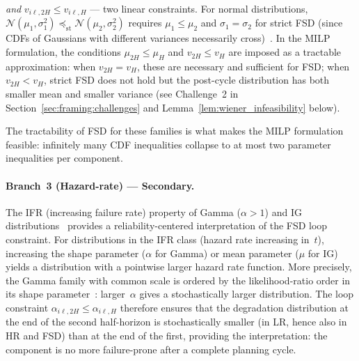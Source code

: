 \documentclass[11pt,a4paper]{article}
\theoremstyle{plain}
\theoremstyle{definition}
\theoremstyle{remark}
\begin{document}
\begin{itemize}[nosep]
        \emph{and} $v_{i\ell,2H} \le v_{i\ell,H}$ --- two linear constraints.
        For normal distributions, $\mathcal{N}(\mu_1, \sigma_1^2)
        \preceq_{\mathrm{st}} \mathcal{N}(\mu_2, \sigma_2^2)$ requires
        $\mu_1 \le \mu_2$ and $\sigma_1 = \sigma_2$ for strict FSD
        (since CDFs of Gaussians with different variances necessarily
        cross)~\cite[Ex.~1.A.7]{shaked2007}. In the MILP formulation,
        the conditions $\mu_{2H} \le \mu_H$ and $v_{2H} \le v_H$ are
        imposed as a tractable approximation: when $v_{2H} = v_H$,
        these are necessary and sufficient for FSD; when $v_{2H} < v_H$,
        strict FSD does not hold but the post-cycle distribution has both
        smaller mean and smaller variance
        (see Challenge~2 in Section~\ref{sec:framing:challenges}
        and Lemma~\ref{lem:wiener_infeasibility} below).
\end{itemize}
The tractability of FSD for these families is what makes
the MILP formulation feasible: infinitely many CDF inequalities collapse
to at most two parameter inequalities per component.

\paragraph{Branch~3 (Hazard-rate) --- Secondary.}
The IFR (increasing failure rate) property of Gamma ($\alpha > 1$) and IG
distributions~\cite[Ch.~1]{shaked2007} provides a reliability-centered interpretation
of the FSD loop constraint.
For distributions in the IFR class (hazard rate increasing in~$t$), increasing the
shape parameter ($\alpha$ for Gamma) or mean parameter ($\mu$ for IG) yields a
distribution with a pointwise larger hazard rate function. More precisely, the
Gamma family with common scale is ordered by the likelihood-ratio order in its
shape parameter~\cite[Thm.~1.C.1]{shaked2007}: larger~$\alpha$ gives a
stochastically larger distribution. The loop constraint
$\alpha_{i\ell,2H} \le \alpha_{i\ell,H}$ therefore ensures that the degradation
distribution at the end of the second half-horizon is stochastically smaller
(in LR, hence also in HR and FSD) than at the end of the first, providing the
interpretation: the component is no more failure-prone after a complete planning
cycle.
\end{document}
